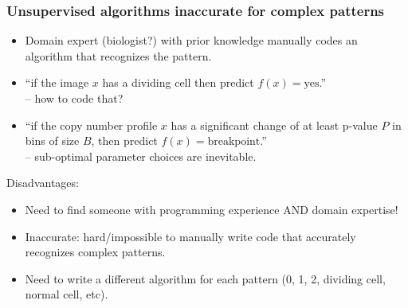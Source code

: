 \documentclass{beamer}
\begin{document}
\begin{frame}
  \frametitle{Unsupervised algorithms inaccurate for 
    complex patterns}
  \begin{itemize}
  \item Domain expert (biologist?) with prior knowledge manually codes an
    algorithm that recognizes the pattern.
  \item ``if the image $x$ has a dividing cell then predict
    $f(x)=\text{yes}$.''\\
    -- how to code that?
  \item ``if the copy number profile $x$ has a significant change of
    at least p-value $P$ in bins of size $B$, then predict
    $f(x)=\text{breakpoint}$.''\\
    -- sub-optimal parameter choices are inevitable.
    \end{itemize}
Disadvantages:
\begin{itemize}
  \item Need to find someone with programming experience AND domain expertise!
  \item Inaccurate: hard/impossible to manually write code that
    accurately recognizes complex patterns.
  \item Need to write a different algorithm for each pattern (0, 1, 2,
    dividing cell, 
    normal cell,
    etc).
  \end{itemize}
\end{frame}
\end{document}
